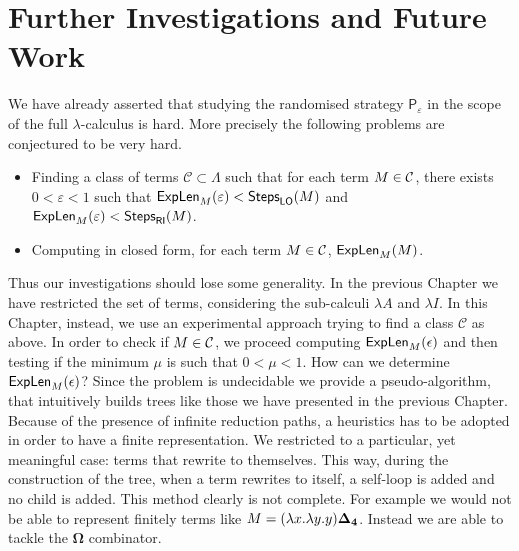 \chapter{Further Investigations and Future Work}
We have already asserted that studying the randomised strategy $\mathsf{P}_\varepsilon$ in the scope of the full $\lambda$-calculus is hard. More precisely the following problems are conjectured to be very hard.
\begin{itemize}
	\item Finding a class of terms $\mathcal{C}\subset\Lambda$ such that for each term $M\in\mathcal{C}$, there exists $0<\varepsilon<1$ such that $\textsf{ExpLen}_{M}(\varepsilon)<\textsf{Steps}_{\textsf{LO}}(M)$ and $\textsf{ExpLen}_{M}(\varepsilon)<\textsf{Steps}_{\textsf{RI}}(M)$.
	\item Computing in closed form, for each term $M\in\mathcal{C}$, $\textsf{ExpLen}_{M}(M)$.
\end{itemize}
Thus our investigations should lose some generality. In the previous Chapter we have restricted the set of terms, considering the sub-calculi $\lambda A$ and $\lambda I$. In this Chapter, instead, we use an experimental approach trying to find a class $\mathcal{C}$ as above. In order to check if $M\in\mathcal{C}$, we proceed computing $\textsf{ExpLen}_{M}(\epsilon)$ and then testing if the minimum $\mu$ is such that $0<\mu<1$. How can we determine $\textsf{ExpLen}_{M}(\epsilon)$? Since the problem is undecidable we provide a pseudo-algorithm, that intuitively builds trees like those we have presented in the previous Chapter. Because of the presence of infinite reduction paths, a heuristics has to be adopted in order to have a finite representation. We restricted to a particular, yet meaningful case: terms that rewrite to themselves. This way, during the construction of the tree, when a term rewrites to itself, a self-loop is added and no child is added. This method clearly is not complete. For example we would not be able to represent finitely terms like $M = (\lambda x.\lambda y.y)\bm{\Delta_4}$. Instead we are able to tackle the $\bm{\Omega}$ combinator.
